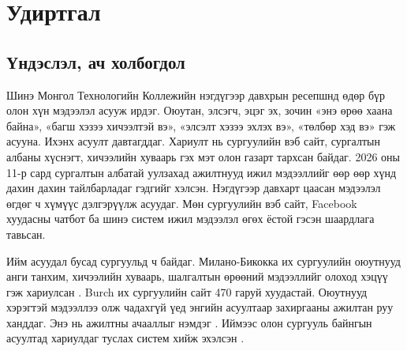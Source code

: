 \chapter{Удиртгал}
\label{ch:introduction}


\section{Үндэслэл, ач холбогдол}
\label{sec:intro-background}

Шинэ Монгол Технологийн Коллежийн нэгдүгээр давхрын ресепшнд өдөр бүр олон хүн мэдээлэл асууж ирдэг. Оюутан, элсэгч, эцэг эх, зочин «энэ өрөө хаана байна», «багш хэзээ хичээлтэй вэ», «элсэлт хэзээ эхлэх вэ», «төлбөр хэд вэ» гэж асууна. Ихэнх асуулт давтагддаг. Хариулт нь сургуулийн вэб сайт, сургалтын албаны хүснэгт, хичээлийн хуваарь гэх мэт олон газарт тархсан байдаг.
2026 оны 11-р сард сургалтын албатай уулзахад ажилтнууд ижил мэдээллийг өөр өөр хүнд дахин дахин тайлбарладаг гэдгийг хэлсэн. Нэгдүгээр давхарт цаасан мэдээлэл өгдөг ч хүмүүс дэлгэрүүлж асуудаг. Мөн сургуулийн вэб сайт, Facebook хуудасны чатбот ба шинэ систем ижил мэдээлэл өгөх ёстой гэсэн шаардлага тавьсан.

Ийм асуудал бусад сургуульд ч байдаг. Милано-Бикокка их сургуулийн оюутнууд анги танхим, хичээлийн хуваарь, шалгалтын өрөөний мэдээллийг олоход хэцүү гэж хариулсан \cite{antico2024unimib}. Burch их сургуулийн сайт 470 гаруй хуудастай. Оюутнууд хэрэгтэй мэдээллээ олж чадахгүй үед энгийн асуултаар захиргааны ажилтан руу ханддаг. Энэ нь ажилтны ачааллыг нэмдэг \cite{matic2026burch}. Иймээс олон сургууль байнгын асуултад хариулдаг туслах систем хийж эхэлсэн \cite{trienes2025marcel,tao2025aloha}.


